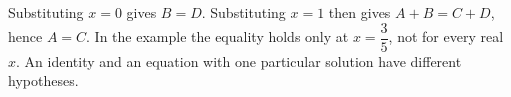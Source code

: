 Substituting $x=0$ gives $B=D$. Substituting $x=1$ then gives $A+B=C+D$, hence $A=C$. In the example the equality holds only at $x=\dfrac{3}{5}$, not for every real $x$. An identity and an equation with one particular solution have different hypotheses.
